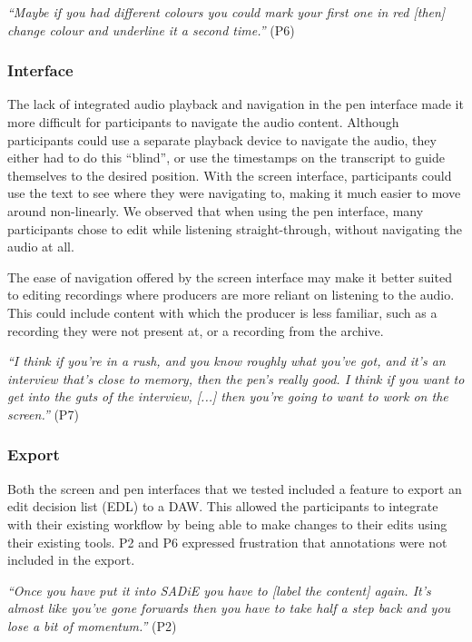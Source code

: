 \textit{``Maybe if you had different colours you could mark your first one in red [then]
change colour and underline it a second time.''} (P6)





\subsubsection{Interface}





The lack of integrated audio playback and navigation in the pen interface made it more difficult for participants to
navigate the audio content.  Although participants could use a separate playback device to navigate the audio,
they either had to do this ``blind'', or use the timestamps on the transcript to guide themselves to the desired
position. With the screen interface, participants could use the text to see where they were navigating to, making it
much easier to move around non-linearly.  We observed that when using the pen interface, many participants chose to
edit while listening straight-through, without navigating the audio at all.

The ease of navigation offered by the screen interface may make it better suited to editing recordings where producers
are more reliant on listening to the audio. This could include content with which the producer is less familiar, such
as a recording they were not present at, or a recording from the archive.

\textit{``I think if you're in a rush, and you know roughly what you've got, and it's an interview that's close to
memory, then the pen's really good. I think if you want to get into the guts of the interview, [...] then you're going
to want to work on the screen.''} (P7)

\subsubsection{Export}

Both the screen and pen interfaces that we tested included a feature to export an edit decision list (EDL) to a DAW.
This allowed the participants to integrate with their existing workflow by being able to make changes to their edits
using their existing tools.  P2 and P6 expressed frustration that annotations were not included in the export.

\textit{``Once you have put it into SADiE you have to [label the content] again. It's almost like you've gone forwards
then you have to take half a step back and you lose a bit of momentum.''} (P2)


